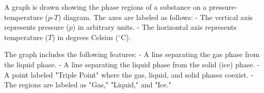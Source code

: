 A graph is drawn showing the phase regions of a substance on a pressure-temperature (\(p\)-\(T\)) diagram. The axes are labeled as follows:  
- The vertical axis represents pressure (\(p\)) in arbitrary units.  
- The horizontal axis represents temperature (\(T\)) in degrees Celsius (\(^\circ\text{C}\)).  

The graph includes the following features:  
- A line separating the gas phase from the liquid phase.  
- A line separating the liquid phase from the solid (ice) phase.  
- A point labeled "Triple Point" where the gas, liquid, and solid phases coexist.  
- The regions are labeled as "Gas," "Liquid," and "Ice."